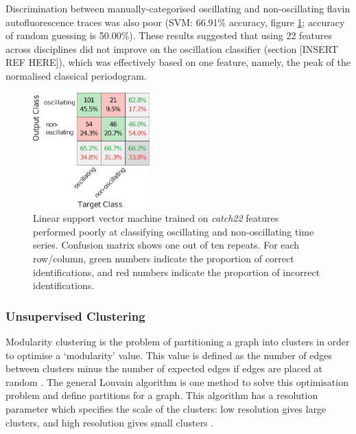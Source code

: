 Discrimination between manually-categorised oscillating and non-oscillating flavin autofluorescence traces was also poor (SVM: 66.91\% accuracy, figure \ref{fig:OscillatingCM}; accuracy of random guessing is 50.00\%). %
These results suggested that using 22 %
features across disciplines did not improve on the oscillation classifier (section [INSERT REF HERE]), which was effectively based on one feature, namely, the peak of the normalised classical periodogram.

\begin{figure}[htbp]
  \centering
  \includegraphics[width=0.4\textwidth]{10m_OscillatingCM}
  \caption{Linear support vector machine trained on \emph{catch22} features performed poorly at classifying oscillating and non-oscillating time series.
    Confusion matrix shows one out of ten repeats.
    For each row/column, green numbers indicate the proportion of correct identifications, and red numbers indicate the proportion of incorrect identifications.}
  \label{fig:OscillatingCM}
\end{figure}

\subsubsection{Unsupervised Clustering}
\label{sec:graphclustering-unsupervised}

Modularity clustering is the problem of partitioning a graph into clusters in order to optimise a `modularity' value.
This value is defined as the number of edges between clusters minus the number of expected edges if edges are placed at random \citep{newmanModularityCommunityStructure2006}.
The general Louvain algorithm \citep{blondelFastUnfoldingCommunities2008,muchaCommunityStructureTimeDependent2010} is one method to solve this optimisation problem and define partitions for a graph.
This algorithm has a resolution parameter which specifies the scale of the clusters: low resolution gives large clusters, and high resolution gives small clusters \citep{fortunatoResolutionLimitCommunity2007}.

